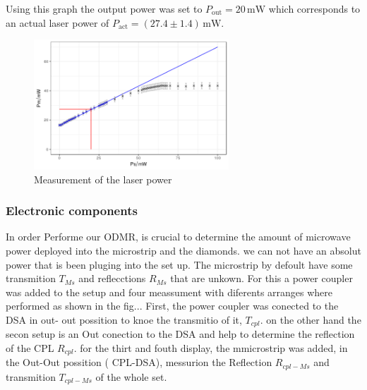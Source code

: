 Using this graph the output power was set to $P_\text{out}=20\,\mathrm{mW}$ which corresponds to an actual laser power of $P_\text{act}=(27.4\pm1.4)\,\mathrm{mW}$.
\begin{figure}[hb]
	\centering
	\includegraphics[width=0.65\textwidth]{../figures/powercal.png}
	\caption{Measurement of the laser power}
	\label{fig:power}
\end{figure}


\subsubsection{Electronic components}

In order Performe our ODMR, is crucial to determine the amount of microwave power deployed into the microstrip and the diamonds. we can not have an absolut power that is been pluging into the set up. The microstrip by defoult have some transmition $T_{Ms}$ and reflecctions $R_{Ms}$ that are unkown.
For this a power coupler was added to the setup and four meassument with diferents arranges where performed as shown in the fig...
First, the power coupler was conected to the DSA in out- out possition to knoe the transmitio of it, $T_{cpl}$. on the other hand the secon setup is an Out conection to the DSA and help to determine the reflection of the CPL $R_{cpl}$. for the thirt and fouth display, the mmicrostrip was added, in the Out-Out possition ( CPL-DSA), messurion the Reflection $R_{cpl-Ms}$ and transmition $T_{cpl-Ms}$ of the whole set.

